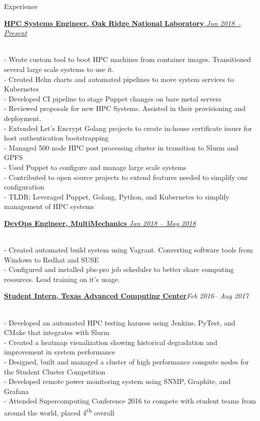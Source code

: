 \documentclass{resume} %
\begin{document}
\begin{rSection}{Experience}

\href{http://olcf.ornl.gov}
{\textbf{HPC Systems Engineer, Oak Ridge National Laboratory}
  \hfill {\em Jun 2018 -- Present}}
  
\\- Wrote custom tool to boot HPC machines from container images. Transitioned
    several large scale systems to use it.
\\- Created Helm charts and automated pipelines to move system services to
    Kubernetes
\\- Developed CI pipeline to stage Puppet changes on bare metal servers
\\- Reviewed proposals for new HPC Systems. Assisted in their provisioning and
    deployment.
\\- Extended Let's Encrypt Golang projects to create in-house certificate issuer for
    host authentication bootstrapping
\\- Managed 500 node HPC post processing cluster in transition to Slurm and GPFS
\\- Used Puppet to configure and manage large scale systems
\\- Contributed to open source projects to extend features needed to simplify our
    configuration
\\- TLDR; Leveraged Puppet, Golang, Python, and Kubernetes to
    simplify management of HPC systems

\href{http://multimechanics.com}
{\textbf{DevOps Engineer, MultiMechanics}
  \hfill
  { \em Jan 2018 -- May 2018 }}
  
\\- Created automated build system using Vagrant. Converting software tools from
    Windows to Redhat and SUSE
\\- Configured and installed pbs-pro job scheduler to better share computing
    resources. Lead training on it's usage.

\href{http://tacc.utexas.edu}
{\textbf{Student Intern, Texas Advanced Computing Center}}\hfill{\em Feb 2016-- Aug 2017}

\\- Developed an automated HPC testing harness using Jenkins, PyTest, and CMake that
    integrates with Slurm
\\- Created a heatmap visualization showing historical degradation and improvement in system performance
\\- Designed, built and managed a cluster of high performance compute nodes for the Student
    Cluster Competition
\\- Developed remote power monitoring system using SNMP, Graphite, and Grafana
\\- Attended Supercomputing Conference 2016 to compete with student teams from around the
    world, placed 4\textsuperscript{th} overall


\end{rSection}
\end{document}
